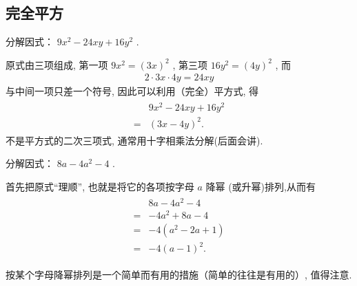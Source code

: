 \subsection{完全平方}
\begin{example}
	分解因式： $9 x^{2}-24 x y+16 y^{2}$ .
\end{example}
\begin{solution}
	原式由三项组成, 第一项 $9 x^{2}=(3 x)^{2}$ , 第三项 $16 y^{2}=(4 y)^{2}$ , 而
	\begin{align*}
		2 \cdot 3 x \cdot 4 y=24 x y
	\end{align*}
	与中间一项只差一个符号, 因此可以利用（完全）平方式, 得
	\begin{align*}
		\begin{aligned}
			  & 9 x^{2}-24 x y+16 y^{2} \\
			= & (3 x-4 y)^{2} .
		\end{aligned}
	\end{align*}
	不是平方式的二次三项式, 通常用十字相乘法分解(后面会讲).
\end{solution}

\begin{example}
	分解因式： $8 a-4 a^{2}-4$ .
\end{example}
\begin{solution}
	首先把原式“理顺”, 也就是将它的各项按字母 $a$ 降幂 (或升幂)排列,从而有
	\begin{align*}
		\begin{aligned}
			  & 8 a-4 a^{2}-4              \\
			= & -4 a^{2}+8 a-4             \\
			= & -4\left(a^{2}-2 a+1\right) \\
			= & -4(a-1)^{2} .
		\end{aligned}
	\end{align*}
\end{solution}
\begin{note}
	按某个字母降幂排列是一个简单而有用的措施（简单的往往是有用的）, 值得注意.
\end{note}

